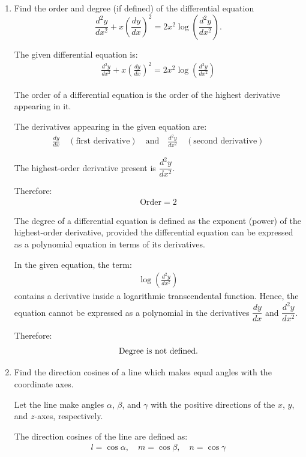 \begin{enumerate}[label=\thesubsection.\arabic*, ref=\thesubsection.\theenumi]
\item Find the order and degree (if defined) of the differential equation
\[
\frac{d^2y}{dx^2}+x\left(\frac{dy}{dx}\right)^2
=2x^2\log\left(\frac{d^2y}{dx^2}\right).
\]

\solution
The given differential equation is:
\begin{align*}
	\frac{d^2y}{dx^2} + x\left(\frac{dy}{dx}\right)^2 = 2x^2\log\left(\frac{d^2y}{dx^2}\right)
\end{align*}


The order of a differential equation is the order of the highest derivative appearing in it. 

The derivatives appearing in the given equation are:
\begin{align*}
	\frac{dy}{dx} \quad (\text{first derivative}) \quad \text{and} \quad \frac{d^2y}{dx^2} \quad (\text{second derivative})
\end{align*}

The highest-order derivative present is $\dfrac{d^2y}{dx^2}$.

Therefore:
\begin{align*}
	\text{Order} = 2
\end{align*}


The degree of a differential equation is defined as the exponent (power) of the highest-order derivative, provided the differential equation can be expressed as a polynomial equation in terms of its derivatives.

In the given equation, the term:
\begin{align*}
	\log\left(\frac{d^2y}{dx^2}\right)
\end{align*}
contains a derivative inside a logarithmic transcendental function. Hence, the equation cannot be expressed as a polynomial in the derivatives $\dfrac{dy}{dx}$ and $\dfrac{d^2y}{dx^2}$.

Therefore:
\begin{align*}
	\text{Degree is \text{not defined}.}
\end{align*}


\item Find the direction cosines of a line which makes equal angles with the coordinate axes.

\solution
Let the line make angles $\alpha$, $\beta$, and $\gamma$ with the positive directions of the $x$, $y$, and $z$-axes, respectively.

The direction cosines of the line are defined as:
\begin{align*}
	l = \cos\alpha, \quad m = \cos\beta, \quad n = \cos\gamma
\end{align*}


\end{enumerate}
